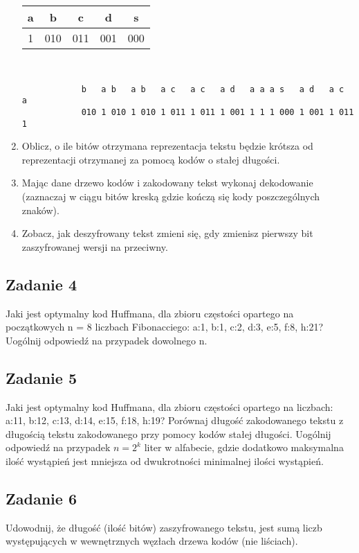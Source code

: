 \documentclass{article}
\begin{document}
\begin{enumerate}[label=(\alph*)]
          \begin{center}
              \begin{tabular}{|c|c|c|c|c|}
                  \hline
                  a & b   & c   & d   & s   \\
                  \hline
                  1 & 010 & 011 & 001 & 000 \\
                  \hline
              \end{tabular} \\[1em]
              \begin{lstlisting}
            b   a b   a b   a c   a c   a d   a a a s   a d   a c   a
            010 1 010 1 010 1 011 1 011 1 001 1 1 1 000 1 001 1 011 1
              \end{lstlisting}
          \end{center}
    \item Oblicz, o ile bitów otrzymana reprezentacja tekstu będzie krótsza od reprezentacji
          otrzymanej za pomocą kodów o stałej długości.
    \item Mając dane drzewo kodów i zakodowany tekst wykonaj dekodowanie (zaznaczaj w
          ciągu bitów kreską gdzie kończą się kody poszczególnych znaków).
    \item Zobacz, jak deszyfrowany tekst zmieni się, gdy zmienisz pierwszy bit zaszyfrowanej
          wersji na przeciwny.
\end{enumerate}

\subsection*{Zadanie 4}
Jaki jest optymalny kod Huffmana, dla zbioru częstości opartego na początkowych n = 8
liczbach Fibonacciego: a:1, b:1, c:2, d:3, e:5, f:8, h:21?
Uogólnij odpowiedź na przypadek dowolnego n.

\subsection*{Zadanie 5}
Jaki jest optymalny kod Huffmana, dla zbioru częstości opartego na liczbach: a:11, b:12,
c:13, d:14, e:15, f:18, h:19? Porównaj długość zakodowanego tekstu z długością tekstu
zakodowanego przy pomocy kodów stałej długości.
Uogólnij odpowiedź na przypadek $n = 2^k$ liter w alfabecie, gdzie dodatkowo maksymalna
ilość wystąpień jest mniejsza od dwukrotności minimalnej ilości wystąpień.

\subsection*{Zadanie 6}
Udowodnij, że długość (ilość bitów) zaszyfrowanego tekstu, jest sumą liczb występujących w
wewnętrznych węzłach drzewa kodów (nie liściach).
\end{document}
